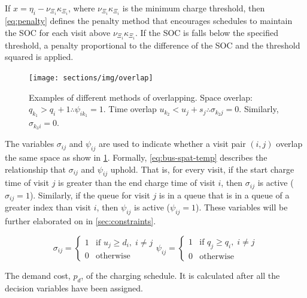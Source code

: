 \documentclass[11pt,a4paper,final]{article}
\begin{document}
If \(x = \eta_i - \nu_{\Xi_i} \kappa_{\Xi_i}\), where \(\nu_{\Xi_i} \kappa_{\Xi_i}\) is the minimum charge threshold, then \ref{eq:penalty} defines the
penalty method that encourages schedules to maintain the SOC for each visit above \(\nu_{\Xi_i} \kappa_{\Xi_i}\). If the SOC is falls
below the specified threshold, a penalty proportional to the difference of the SOC and the threshold squared is applied.

\begin{figure}[htpb]
  \centering \texttt{[image: sections/img/overlap]}
  \caption{Examples of different methods of overlapping. Space overlap: $q_{k_1} > q_{i} + 1 \therefore \psi_{ik_{1}} = 1$.
    Time overlap $u_{k_2} < u_{j} + s_j \therefore \sigma_{k_{2}j} = 0$. Similarly, $\sigma_{k_3 i} = 0$.}
  \label{fig:overlap}
\end{figure}

The variables \(\sigma_{ij}\) and \(\psi_{ij}\) are used to indicate whether a visit pair \((i, j)\) overlap the same space as show in
\ref{fig:overlap}. Formally, \ref{eq:bus-spat-temp} describes the relationship that \(\sigma_{ij}\) and \(\psi_{ij}\) uphold. That is, for
every visit, if the start charge time of visit \(j\) is greater than the end charge time of visit \(i\), then \(\sigma_{ij}\) is
active (\(\sigma_{ij} = 1\)). Similarly, if the queue for visit \(j\) is in a queue that is in a queue of a greater index than
visit \(i\), then \(\psi_{ij}\) is active (\(\psi_{ij} = 1\)). These variables will be further elaborated on in \ref{sec:constraints}.

\begin{subequations}
\label{eq:bus-spat-temp}
\begin{equation}
  \sigma_{ij} =
  \begin{cases}
    1 & \text{if } u_j \ge d_i, \; i \ne j\\
    0 & \text{otherwise}
  \end{cases}
\end{equation}

\begin{equation}
  \psi_{ij} =
  \begin{cases}
    1 & \text{if } q_j \ge q_i,\; i \ne j\\
    0 & \text{otherwise}
  \end{cases}
\end{equation}
\end{subequations}

The demand cost, \(p_d\), of the charging schedule. It is calculated after all the decision variables have been assigned.
\end{document}

